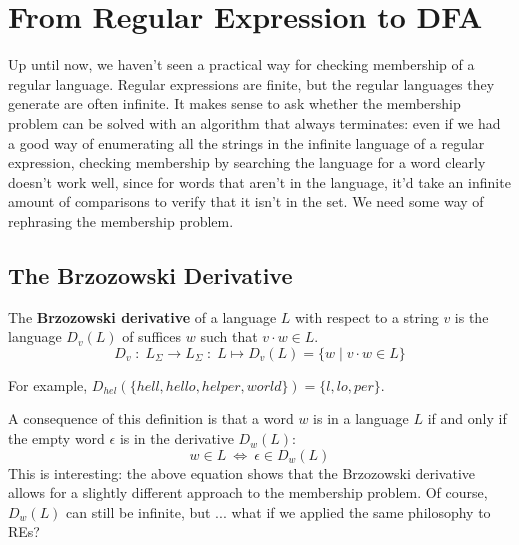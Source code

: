 \section{From Regular Expression to DFA}\label{fsa2resec}
Up until now, we haven't seen a practical way for checking membership of a regular language. Regular expressions are finite, but the regular languages they generate are often infinite. It makes sense to ask whether the membership problem can be solved with an algorithm that always terminates: even if we had a good way of enumerating all the strings in the infinite language of a regular expression, checking membership by searching the language for a word clearly doesn't work well, since for words that aren't in the language, it'd take an infinite amount of comparisons to verify that it isn't in the set. We need some way of rephrasing the membership problem.

\subsection{The Brzozowski Derivative}
\begin{definition}
The \textbf{Brzozowski derivative} of a language $L$ with respect to a string
$v$ is the language $D_v(L)$ of suffices $w$ such that $v \cdot w \in L$.
\begin{equation*}
	D_v \;:\; L_\Sigma \to L_\Sigma \;:\; L \mapsto D_v(L) = \{ w \mid v \cdot w \in L \}
\end{equation*}
\end{definition}
For example, $D_{\mathit{hel}}(\{\mathit{hell}, \mathit{hello},\mathit{helper},\mathit{world}\}) = 
\{ \mathit{l}, \mathit{lo}, \mathit{per} \}$.

A consequence of this definition is that a word $w$ is in a language $L$ if and only if
the empty word $\epsilon$ is in the derivative $D_w(L)$:
\begin{equation*}
	w \in L ~\Leftrightarrow~ \epsilon \in D_w(L)
\end{equation*}
This is interesting: the above equation shows that the Brzozowski derivative allows for a slightly different approach to the membership problem. Of course, $D_w(L)$ can still be infinite, but ... what if we applied the same philosophy to REs?


